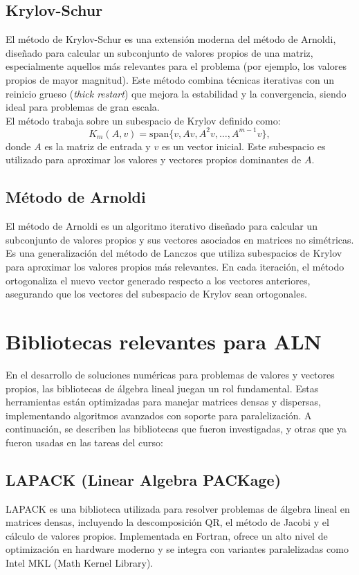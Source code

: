 \documentclass{article}
\begin{document}
\subsection{Krylov-Schur}

El método de Krylov-Schur es una extensión moderna del método de Arnoldi, diseñado para calcular un subconjunto de valores propios de una matriz, especialmente aquellos más relevantes para el problema (por ejemplo, los valores propios de mayor magnitud). Este método combina técnicas iterativas con un reinicio grueso (\textit{thick restart}) que mejora la estabilidad y la convergencia, siendo ideal para problemas de gran escala.
\\
El método trabaja sobre un subespacio de Krylov definido como:
\[
K_m(A, v) = \text{span}\{v, Av, A^2v, \ldots, A^{m-1}v\},
\]
donde \(A\) es la matriz de entrada y \(v\) es un vector inicial. Este subespacio es utilizado para aproximar los valores y vectores propios dominantes de \(A\).

\subsection{Método de Arnoldi}

El método de Arnoldi es un algoritmo iterativo diseñado para calcular un subconjunto de valores propios y sus vectores asociados en matrices no simétricas. Es una generalización del método de Lanczos que utiliza subespacios de Krylov para aproximar los valores propios más relevantes.
En cada iteración, el método ortogonaliza el nuevo vector generado respecto a los vectores anteriores, asegurando que los vectores del subespacio de Krylov sean ortogonales.

\section{Bibliotecas relevantes para ALN}
En el desarrollo de soluciones numéricas para problemas de valores y vectores propios, las bibliotecas de álgebra lineal juegan un rol fundamental. Estas herramientas están optimizadas para manejar matrices densas y dispersas, implementando algoritmos avanzados con soporte para paralelización. A continuación, se describen las bibliotecas que fueron investigadas, y otras que ya fueron usadas en las tareas del curso:

\subsection{LAPACK (Linear Algebra PACKage)}
LAPACK es una biblioteca utilizada para resolver problemas de álgebra lineal en matrices densas, incluyendo la descomposición QR, el método de Jacobi y el cálculo de valores propios. Implementada en Fortran, ofrece un alto nivel de optimización en hardware moderno y se integra con variantes paralelizadas como Intel MKL (Math Kernel Library).
\end{document}
